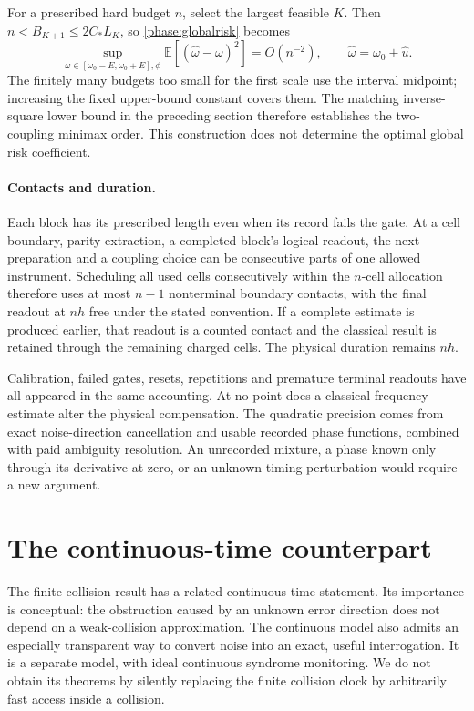 \documentclass[11pt,a4paper]{article}
\numberwithin{equation}{section}
\theoremstyle{remark}
\begin{document}
For a prescribed hard budget $n$, select the largest feasible $K$.
Then $n<B_{K+1}\le2C_*L_K$, so \eqref{phase:globalrisk} becomes
\begin{equation}
 \sup_{\omega\in[\omega_0-E,\omega_0+E],\phi}
 \mathbb E[(\widehat\omega-\omega)^2]=O(n^{-2}),
 \qquad \widehat\omega=\omega_0+\widehat u.
 \label{phase:attainment}
\end{equation}
The finitely many budgets too small for the first scale use the interval
midpoint; increasing the fixed upper-bound constant covers them.  The
matching inverse-square lower bound in the preceding section therefore
establishes the two-coupling minimax order.  This construction does not
determine the optimal global risk coefficient.

\paragraph{Contacts and duration.}
Each block has its prescribed length even when its record fails the gate.
At a cell boundary, parity extraction, a completed block's logical readout,
the next preparation and a coupling choice can be consecutive parts of one
allowed instrument.  Scheduling all used cells consecutively within the
$n$-cell allocation therefore uses at most $n-1$ nonterminal boundary
contacts, with the final readout at $nh$ free under the stated convention.
If a complete estimate is produced earlier, that readout is a counted
contact and the classical result is retained through the remaining charged
cells.  The physical duration remains $nh$.

Calibration, failed gates, resets, repetitions and premature terminal
readouts have all appeared in the same accounting.  At no point does a
classical frequency estimate alter the physical compensation.  The
quadratic precision comes from exact noise-direction cancellation and
usable recorded phase functions, combined with paid ambiguity resolution.
An unrecorded mixture, a phase known only through its derivative at zero,
or an unknown timing perturbation would require a new argument.


\section{The continuous-time counterpart}
\label{markov:continuous}

The finite-collision result has a related continuous-time statement. Its
importance is conceptual: the obstruction caused by an unknown error direction
does not depend on a weak-collision approximation. The continuous model also
admits an especially transparent way to convert noise into an exact, useful
interrogation. It is a separate model, with ideal continuous syndrome monitoring.
We do not obtain its theorems by silently replacing the finite collision clock
by arbitrarily fast access inside a collision.
\end{document}
